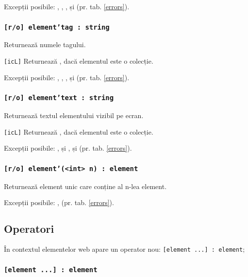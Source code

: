 Excepții posibile: , , ,  și  (pr. tab. \ref{errors}).

\subsubsection{\texttt{[r/o] element'tag : string}}

Returnează numele tagului.

\texttt{[icL]} Returnează \listtype, dacă elementul este o colecție.

Excepții posibile: , , ,  și  (pr. tab. \ref{errors}).

\subsubsection{\texttt{[r/o] element'text : string}}

Returnează textul elementului vizibil pe ecran. 

\texttt{[icL]} Returnează \listtype, dacă elementul este o colecție.

Excepții posibile: ,  și ,  și  (pr. tab. \ref{errors}).

\subsubsection{\texttt{[r/o] element'(<int> n) : element}}

Returnează element unic care conține al n-lea element.

Excepții posibile: ,  (pr. tab. \ref{errors}).

\subsection{Operatori}

În contextul elementelor web apare un operator nou: \texttt{[element ...] : element};

\subsubsection{\texttt{[element ...] : element}}


